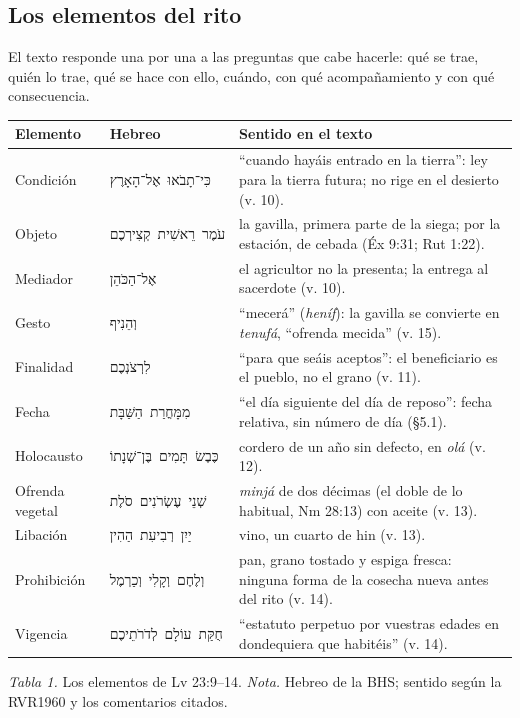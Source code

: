 \documentclass[11pt,letterpaper]{article}
\newcommand{\heb}[1]{\mbox{\foreignlanguage{hebrew}{#1}}}
\begin{document}
\subsection{Los elementos del rito}
El texto responde una por una a las preguntas que cabe hacerle: qué se trae, quién lo trae, qué se hace con ello, cuándo, con qué acompañamiento y con qué consecuencia.

\begin{center}\begin{minipage}{\linewidth}\centering\footnotesize\renewcommand{\arraystretch}{1.15}
\begin{tabular}{@{}L{2.6cm}L{4.2cm}L{7.6cm}@{}}
\toprule
\textbf{Elemento} & \textbf{Hebreo} & \textbf{Sentido en el texto} \\ \midrule
Condición & \heb{כִּי־תָבֹאוּ אֶל־הָאָרֶץ} & ``cuando hayáis entrado en la tierra'': ley para la tierra futura; no rige en el desierto (v. 10). \\
Objeto & \heb{עֹמֶר רֵאשִׁית קְצִירְכֶם} & la gavilla, primera parte de la siega; por la estación, de cebada (Éx 9:31; Rut 1:22). \\
Mediador & \heb{אֶל־הַכֹּהֵן} & el agricultor no la presenta; la entrega al sacerdote (v. 10). \\
Gesto & \heb{וְהֵנִיף} & ``mecerá'' (\emph{heníf}): la gavilla se convierte en \emph{tenufá}, ``ofrenda mecida'' (v. 15). \\
Finalidad & \heb{לִרְצֹנְכֶם} & ``para que seáis aceptos'': el beneficiario es el pueblo, no el grano (v. 11). \\
Fecha & \heb{מִמָּחֳרַת הַשַּׁבָּת} & ``el día siguiente del día de reposo'': fecha relativa, sin número de día (§5.1). \\
Holocausto & \heb{כֶּבֶשׂ תָּמִים בֶּן־שְׁנָתוֹ} & cordero de un año sin defecto, en \emph{olá} (v. 12). \\
Ofrenda vegetal & \heb{שְׁנֵי עֶשְׂרֹנִים סֹלֶת} & \emph{minjá} de dos décimas (el doble de lo habitual, Nm 28:13) con aceite (v. 13). \\
Libación & \heb{יַיִן רְבִיעִת הַהִין} & vino, un cuarto de hin (v. 13). \\
Prohibición & \heb{וְלֶחֶם וְקָלִי וְכַרְמֶל} & pan, grano tostado y espiga fresca: ninguna forma de la cosecha nueva antes del rito (v. 14). \\
Vigencia & \heb{חֻקַּת עוֹלָם לְדֹרֹתֵיכֶם} & ``estatuto perpetuo por vuestras edades en dondequiera que habitéis'' (v. 14). \\
\bottomrule
\end{tabular}\par
{\footnotesize\color{sepia}\textit{Tabla 1.} Los elementos de Lv 23:9--14. \textit{Nota.} Hebreo de la BHS; sentido según la RVR1960 y los comentarios citados.}
\end{minipage}\end{center}
\end{document}
